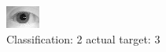 \begin{figure}[h!]
\begin{center}
\includegraphics[width=0.60\columnwidth]{figures/ID1058_class_2_target_3.png}
\end{center}
\caption{ Classification: 2 actual target: 3}
\label{fig:ID1058_class_2_target_3}
\end{figure}
